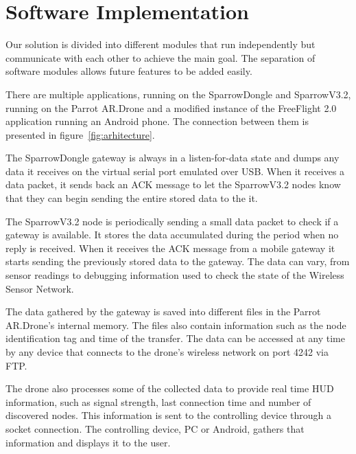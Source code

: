 \normalfont\normalsize
\chapter{Software Implementation}

Our solution is divided into different modules that run independently but communicate with each other to achieve the main goal. The separation of software modules allows future features to be added easily.

There are multiple applications, running on the SparrowDongle and SparrowV3.2, running on the Parrot AR.Drone and a modified instance of the FreeFlight 2.0 application running an Android phone. The connection between them is presented in figure~\ref{fig:arhitecture}.

The SparrowDongle gateway is always in a listen-for-data state and dumps any data it receives on the virtual serial port emulated over USB. When it receives a data packet, it sends back an ACK message to let the SparrowV3.2 nodes know that they can begin sending the entire stored data to the it.

The SparrowV3.2 node is periodically sending a small data packet to check if a gateway is available. It stores the data accumulated during the period when no reply is received. When it receives the ACK message from a mobile gateway it starts sending the previously stored data to the gateway. The data can vary, from sensor readings to debugging information used to check the state of the Wireless Sensor Network.

The data gathered by the gateway is saved into different files in the Parrot AR.Drone's internal memory. The files also contain information such as the node identification tag and time of the transfer. The data can be accessed at any time by any device that connects to the drone's wireless network on port 4242 via FTP.

The drone also processes some of the collected data to provide real time HUD information, such as signal strength, last connection time and number of discovered nodes. This information is sent to the controlling device through a socket connection. The controlling device, PC or Android, gathers that information and displays it to the user. 

\clearpage

